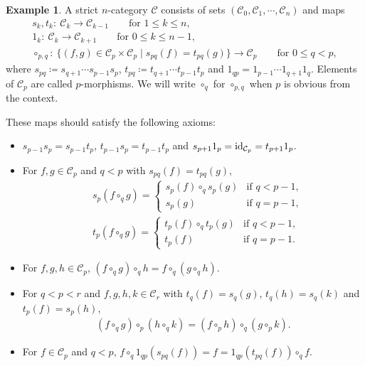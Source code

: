 \documentclass[10pt,a4paper]{amsart}
\numberwithin{equation}{section}
\theoremstyle{definition}
\newtheorem{Example}[Theorem]{Example}
\begin{document}
\begin{Example}\label{ex:polygon from n-groupid}
 A strict $n$-category $\mathcal{C}$ consists of sets $(\mathcal{C}_0,\mathcal{C}_1,\cdots,\mathcal{C}_n)$ and maps
 \begin{gather*}
 s_k, t_k \colon \ \mathcal{C}_k \to \mathcal{C}_{k-1} \qquad \text{for } 1 \leq k \leq n ,\\
 1_k \colon \ \mathcal{C}_k \to \mathcal{C}_{k+1} \qquad \text{for } 0 \leq k \leq n-1 ,
\\
 \circ_{p,q} \colon \ \{(f,g)\in \mathcal{C}_p \times \mathcal{C}_p\mid s_{pq}(f)=t_{pq}(g)\} \to \mathcal{C}_p \qquad \text{for } 0 \leq q < p,
 \end{gather*}
 where $s_{pq} \coloneqq s_{q+1}\cdots s_{p-1}s_p$, $t_{pq} \coloneqq t_{q+1}\cdots t_{p-1}t_p$ and $1_{qp}=1_{p-1}\cdots 1_{q+1}1_{q}$.
 Elements of $\mathcal{C}_p$ are called $p$-morphisms.
 We will write $\circ_q$ for $\circ_{p,q}$ when $p$ is obvious from the context.

 These maps should satisfy the following axioms:
 \begin{itemize}\itemsep=0pt
 \item $s_{p-1}s_{p}=s_{p-1}t_p$, $t_{p-1}s_p=t_{p-1}t_p$ and $s_{p+1}1_p={\rm id}_{\mathcal{C}_p}=t_{p+1}1_p$.
 \item For $f,g\in \mathcal{C}_p$ and $q<p$ with $s_{pq}(f)=t_{pq}(g)$,
 \begin{align*}
 & s_{p}(f\circ_q g)=
 \begin{cases}
 s_p(f)\circ_q s_p(g) &\text{if $q<p-1$,} \\
 s_p(g) &\text{if $q=p-1$,}
 \end{cases} \\
 & t_{p}(f\circ_q g)=
 \begin{cases}
 t_p(f)\circ_q t_p(g) &\text{if $q<p-1$,} \\
 t_p(f) &\text{if $q=p-1$.}
 \end{cases}
 \end{align*}
 \item For $f, g ,h\in \mathcal{C}_p$, $(f\circ_q g)\circ_q h=f\circ_q (g\circ_q h)$.
 \item For $q<p<r$ and $f, g, h, k\in\mathcal{C}_r$ with $t_q(f)=s_q(g)$, $t_q(h)=s_q(k)$ and $t_p(f)=s_p(h)$,
 \begin{align*}
 (f\circ_q g)\circ_p (h\circ_q k)=(f\circ_p h)\circ_q(g\circ_p k).
 \end{align*}
 \item For $f\in\mathcal{C}_p$ and $q<p$, $f\circ_q 1_{qp}(s_{pq}(f))=f=1_{qp}(t_{pq}(f))\circ_q f$.
 \end{itemize}


\end{Example}
\end{document}
